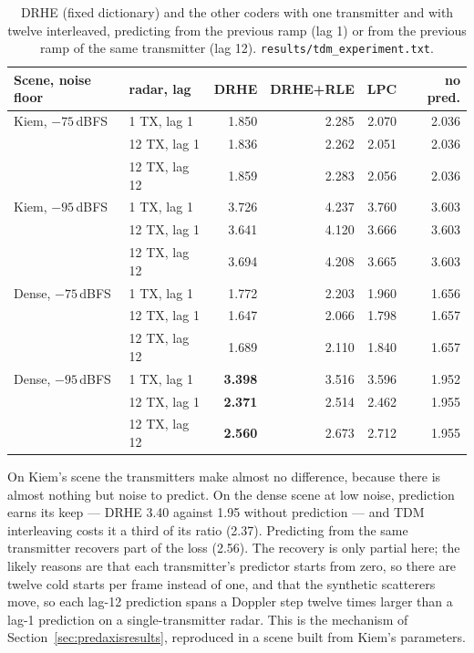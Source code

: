 \begin{table}[htbp]
\centering
\caption[One against twelve transmitters]{DRHE (fixed dictionary) and the other
coders with one transmitter and with twelve interleaved, predicting from the
previous ramp (lag 1) or from the previous ramp of the same transmitter
(lag 12). \texttt{results/tdm\_experiment.txt}.}
\label{tab:kr_tdm}
\small
\begin{tabular}{@{}llrrrr@{}}
\toprule
Scene, noise floor & radar, lag & DRHE & DRHE+RLE & LPC & no pred.\\
\midrule
Kiem, $-75$\,dBFS  & 1 TX, lag 1   & 1.850 & 2.285 & 2.070 & 2.036\\
                   & 12 TX, lag 1  & 1.836 & 2.262 & 2.051 & 2.036\\
                   & 12 TX, lag 12 & 1.859 & 2.283 & 2.056 & 2.036\\
\midrule
Kiem, $-95$\,dBFS  & 1 TX, lag 1   & 3.726 & 4.237 & 3.760 & 3.603\\
                   & 12 TX, lag 1  & 3.641 & 4.120 & 3.666 & 3.603\\
                   & 12 TX, lag 12 & 3.694 & 4.208 & 3.665 & 3.603\\
\midrule
Dense, $-75$\,dBFS & 1 TX, lag 1   & 1.772 & 2.203 & 1.960 & 1.656\\
                   & 12 TX, lag 1  & 1.647 & 2.066 & 1.798 & 1.657\\
                   & 12 TX, lag 12 & 1.689 & 2.110 & 1.840 & 1.657\\
\midrule
Dense, $-95$\,dBFS & 1 TX, lag 1   & \textbf{3.398} & 3.516 & 3.596 & 1.952\\
                   & 12 TX, lag 1  & \textbf{2.371} & 2.514 & 2.462 & 1.955\\
                   & 12 TX, lag 12 & \textbf{2.560} & 2.673 & 2.712 & 1.955\\
\bottomrule
\end{tabular}
\end{table}

\noindent
On Kiem's scene the transmitters make almost no difference, because there is
almost nothing but noise to predict. On the dense scene at low noise, prediction
earns its keep --- DRHE 3.40 against 1.95 without prediction --- and TDM
interleaving costs it a third of its ratio (2.37). Predicting from the same
transmitter recovers part of the loss (2.56). The recovery is only partial here;
the likely reasons are that each transmitter's predictor starts from zero, so
there are twelve cold starts per frame instead of one, and that the synthetic
scatterers move, so each lag-12 prediction spans a Doppler step twelve times
larger than a lag-1 prediction on a single-transmitter radar. This is the mechanism of Section~\ref{sec:predaxisresults}, reproduced in
a scene built from Kiem's parameters.

